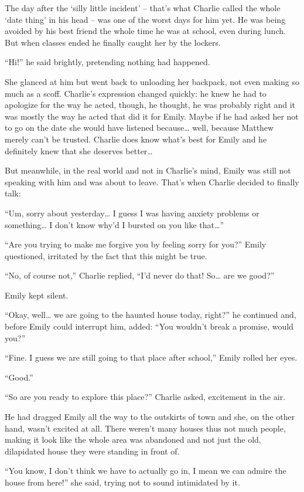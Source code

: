 The day after the ‘silly little incident’ – that’s what Charlie called the whole ‘date thing’ in his head – was one of the worst days for him yet. He was being avoided by his best friend the whole time he was at school, even during lunch. But when classes ended he finally caught her by the lockers.

“Hi!” he said brightly, pretending nothing had happened.

She glanced at him but went back to unloading her backpack, not even making so much as a scoff. Charlie’s expression changed quickly: he knew he had to apologize for the way he acted, though, he thought, he was probably right and it was mostly the way he acted that did it for Emily. Maybe if he had asked her not to go on the date she would have listened because… well, because Matthew merely can’t be trusted. Charlie does know what’s best for Emily and he definitely knew that she deserves better…

But meanwhile, in the real world and not in Charlie’s mind, Emily was still not speaking with him and was about to leave. That’s when Charlie decided to finally talk:

“Um, sorry about yesterday… I guess I was having anxiety problems or something… I don’t know why’d I bursted on you like that…”

“Are you trying to make me forgive you by feeling sorry for you?” Emily questioned, irritated by the fact that this might be true.

“No, of course not,” Charlie replied, “I’d never do that! So… are we good?”

Emily kept silent.
  
“Okay, well… we are going to the haunted house today, right?” he continued and, before Emily could interrupt him, added: “You wouldn’t break a promise, would you?”

“Fine. I guess we are still going to that place after school,” Emily rolled her eyes.

“Good.”

\bigskip

“So are you ready to explore this place?” Charlie asked, excitement in the air.

He had dragged Emily all the way to the outskirts of town and she, on the other hand, wasn’t excited at all. There weren’t many houses thus not much people, making it look like the whole area was abandoned and not just the old, dilapidated house they were standing in front of.

“You know, I don’t think we have to actually go in, I mean we can admire the house from here!” she said, trying not to sound intimidated by it.

